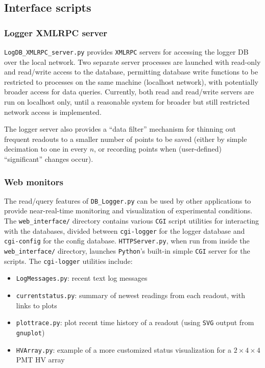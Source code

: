 \documentclass[12pt,english]{article}
\newcommand{\cd}[1]{\texttt{#1}}
\begin{document}
%
%
\subsection{Interface scripts}

%
\subsubsection{Logger XMLRPC server}

\cd{LogDB\_XMLRPC\_server.py} provides \cd{XMLRPC} servers for accessing the logger DB over the local network.
Two separate server processes are launched with read-only and read/write access to the database,
	permitting database write functions to be restricted to processes on the same machine (localhost network),
	with potentially broader access for data queries.
Currently, both read and read/write servers are run on localhost only,
	until a reasonable system for broader but still restricted network access is implemented.

The logger server also provides a ``data filter'' mechanism for thinning out frequent readouts
	to a smaller number of points to be saved
	(either by simple decimation to one in every $n$,
	or recording points when (user-defined) ``significant'' changes occur).

%
\subsubsection{Web monitors}

The read/query features of \cd{DB\_Logger.py} can be used by other applications to provide
	near-real-time monitoring and visualization of experimental conditions.
The \cd{web\_interface/} directory contains various \cd{CGI} script utilities for
	interacting with the databases, divided between \cd{cgi-logger} for the logger database
	and \cd{cgi-config} for the config database.
\cd{HTTPServer.py}, when run from inside the \cd{web\_interface/} directory,
	launches \cd{Python}'s built-in simple \cd{CGI} server for the scripts.
The \cd{cgi-logger} utilities include:
\begin{itemize}
	\item \cd{LogMessages.py}: recent text log messages
	\item \cd{currentstatus.py}: summary of newest readings from each readout, with links to plots
	\item \cd{plottrace.py}: plot recent time history of a readout (using \cd{SVG} output from \cd{gnuplot})
	\item \cd{HVArray.py}: example of a more customized status visualization for a $2\times4\times4$ PMT HV array
\end{itemize}
\end{document}
